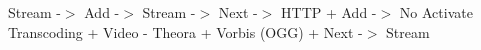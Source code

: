 
\begin{DoxyEnumerate}
\item Stream -\/$>$ Add -\/$>$ Stream -\/$>$ Next -\/$>$ H\+T\+T\+P + Add -\/$>$ No Activate Transcoding + Video -\/ Theora + Vorbis (O\+G\+G) + Next -\/$>$ Stream 
\end{DoxyEnumerate}